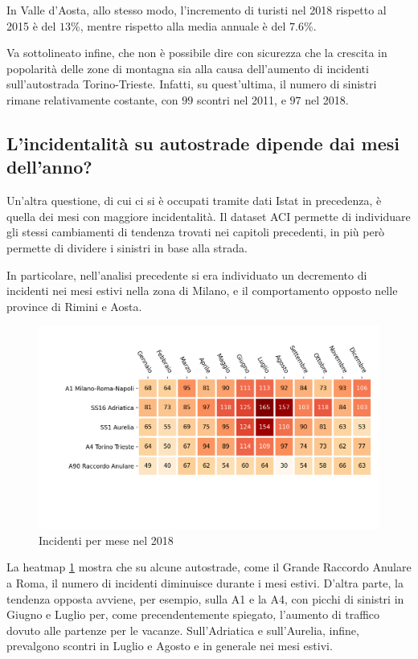 \documentclass[a4paper,12pt]{report}
\begin{document}
In Valle d'Aosta, allo stesso modo, l'incremento di turisti nel 2018 
rispetto al 2015 è del $13$\%, mentre rispetto alla media annuale 
è del $7.6$\%.

Va sottolineato infine, che non è possibile dire con sicurezza che 
la crescita in popolarità delle zone di montagna sia alla causa dell'aumento 
di incidenti sull'autostrada Torino-Trieste. 
Infatti, su quest'ultima, il numero di sinistri rimane relativamente costante, 
con $99$ scontri nel 2011, e $97$ nel 2018.

\subsection{L'incidentalità su autostrade dipende dai mesi dell'anno?}

Un'altra questione, di cui ci si è occupati tramite dati Istat in precedenza, è 
quella dei mesi con maggiore incidentalità.
Il dataset ACI permette di individuare gli stessi cambiamenti di tendenza trovati nei 
capitoli precedenti, in più però permette di dividere i sinistri in base alla strada.

In particolare, nell'analisi precedente si era individuato un decremento di incidenti 
nei mesi estivi nella zona di Milano, e il comportamento opposto nelle province di 
Rimini e Aosta.

\begin{figure}
    \includegraphics[width=\linewidth]{../src/incidenti/incidenti_aci/autostrade/mesi_autostrade.png}
    \caption{Incidenti per mese nel 2018}
    \label{fig:incidenti-per-mese}
\end{figure}

La heatmap \ref{fig:incidenti-per-mese} mostra che su alcune autostrade, come il 
Grande Raccordo Anulare a Roma, il numero di incidenti diminuisce durante i mesi 
estivi.
D'altra parte, la tendenza opposta avviene, per esempio, sulla A1 e la A4, 
con picchi di sinistri in Giugno e Luglio per, come precendentemente spiegato, 
l'aumento di traffico dovuto alle partenze per le vacanze.
Sull'Adriatica e sull'Aurelia, infine, prevalgono scontri 
in Luglio e Agosto e in generale nei mesi estivi.
\end{document}
